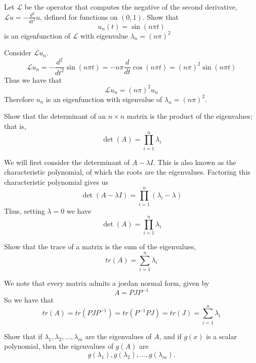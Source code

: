 \documentclass{homework}
\begin{document}
\begin{problem}[6-1]
  Let $\mathcal{L}$ be the operator that computes the negative of the second derivative, $\mathcal{L}u = -\frac{d^2}{dt^2}u$, defined for functions on $(0,1)$. Show that
  \[u_n(t) = \sin (n\pi t)\]
  is an eigenfunction of $\mathcal{L}$ with eigenvalue $\lambda_n = (n\pi)^2$
\end{problem}

\begin{solution}
  Consider $\mathcal{L}u_n$. 
  \[\mathcal{L}u_n = -\frac{d^2}{dt^2}\sin (n\pi t) = -n\pi \frac{d}{dt}\cos (n\pi t)
  = (n\pi)^2 \sin(n \pi t)\]
  Thus we have that 
  \[ \mathcal{L}u_n = (n \pi)^2u_n\]
  Therefore $u_n$ is an eigenfunction with eigenvalue of $\lambda_n = (n \pi)^2$.
\end{solution}

\begin{problem}[6-4]
 Show that the determinant of an $n \times n$ matrix is the product of the eigenvalues; that is,
 \[ \det(A) = \prod_{i=1}^{n}\lambda_i \]
\end{problem}

\begin{solution}
 We will first consider the determinant of $A - \lambda I$. This is also known as the characteristic polynomial, of which the roots are the eigenvalues. Factoring this characteristic polynomial gives us
 \[ \det(A- \lambda I) = \prod_{i=1}^{n}(\lambda_i - \lambda)\]
 Thus, setting $\lambda = 0$ we have
 \[ \det(A) = \prod_{i=1}^{n} \lambda_i\]
\end{solution}

\begin{problem}[6-5]
  Show that the trace of a matrix is the sum of the eigenvalues, 
  \[ tr(A) = \sum_{i=1}^n \lambda_i\]
\end{problem}

\begin{solution}
  We note that every matrix admits a jordan normal form, given by
  \[ A = PJP^{-1}\]
  So we have that
  \[ tr(A) = tr(PJP^{-1}) = tr(P^{-1}PJ) = tr(J) = \sum_{i=1}^{n} \lambda_i\]
\end{solution}

\begin{problem}[6-11]
  Show that if $\lambda_1, \lambda_2, \dots, \lambda_m$ are the eigenvalues of $A$, and if $g(x)$ is a scalar polynomial, then the eigenvalues of $g(A)$ are 
  \[g(\lambda_1), g(\lambda_2), \dots, g(\lambda_m).\] 
\end{problem}
\end{document}
